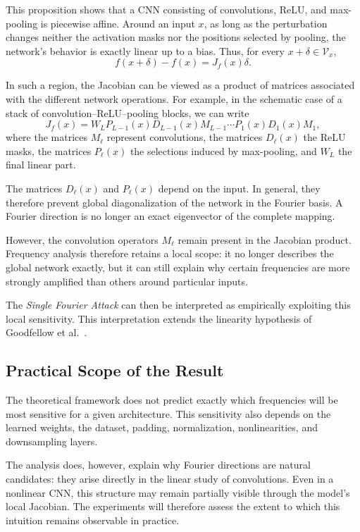 This proposition shows that a CNN consisting of convolutions, ReLU, and max-pooling is
piecewise affine. Around an input $x$, as long as the perturbation changes neither the activation masks nor the positions selected
by pooling, the network's behavior is exactly linear up to a bias. Thus, for
every $x+\delta\in\mathcal{V}_x$,
\[
    f(x+\delta)-f(x)=J_f(x)\delta.
\]

In such a region, the Jacobian can be viewed as a product of matrices associated with
the different network operations. For example, in the schematic case of a stack of
convolution--ReLU--pooling blocks, we can write
\[
    J_f(x)
    =
    W_L P_{L-1}(x)D_{L-1}(x)M_{L-1}
    \cdots
    P_1(x)D_1(x)M_1,
\]
where the matrices $M_\ell$ represent convolutions, the matrices $D_\ell(x)$ the ReLU
masks, the matrices $P_\ell(x)$ the selections induced by max-pooling, and $W_L$ the final
linear part.

The matrices $D_\ell(x)$ and $P_\ell(x)$ depend on the input. In general, they therefore prevent
global diagonalization of the network in the Fourier basis. A Fourier direction is
no longer an exact eigenvector of the complete mapping.

However, the convolution operators $M_\ell$ remain present in the Jacobian
product. Frequency analysis therefore retains a local scope: it no longer describes
the global network exactly, but it can still explain why certain frequencies are more strongly
amplified than others around particular inputs.

The \textit{Single Fourier Attack} can then be interpreted as empirically exploiting
this local sensitivity. This interpretation extends the linearity hypothesis of Goodfellow et
al.~\cite{goodfellow2015explaining}.

\subsection{Practical Scope of the Result}

The theoretical framework does not predict exactly which frequencies will be most
sensitive for a given architecture. This sensitivity also depends on the learned weights, the
dataset, padding, normalization, nonlinearities, and downsampling layers.

The analysis does, however, explain why Fourier directions are natural
candidates: they arise directly in the linear study of convolutions. Even in a
nonlinear CNN, this structure may remain partially visible through the model's local
Jacobian. The experiments will therefore assess the extent to which this intuition remains
observable in practice.

